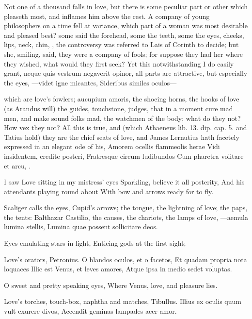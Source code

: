 Not one of a thousand falls in love, but there is some peculiar part or
other which pleaseth most, and inflames him above the rest. A
company of young philosophers on a time fell at variance, which part of
a woman was most desirable and pleased best? some said the forehead,
some the teeth, some the eyes, cheeks, lips, neck, chin, \etc{}, the
controversy was referred to Lais of Corinth to decide; but she,
smiling, said, they were a company of fools; for suppose they had her
where they wished, what would they first seek? Yet this
notwithstanding I do easily grant, neque quis vestrum negaverit opinor,
all parts are attractive, but especially the eyes, 
---videt igne micantes,
Sideribus similes oculos---

which are love's fowlers; aucupium amoris, the shoeing horns, the
hooks of love (as Arandus will) the guides, touchstone, judges, that in
a moment cure mad men, and make sound folks mad, the watchmen of the
body; what do they not? How vex they not? All this is true, and (which
Athaeneus lib. 13. dip. cap. 5. and Tatius hold) they are the chief
seats of love, and James Lernutius hath facetely expressed in an
elegant ode of his,
Amorem ocellis flammeolis herae
Vidi insidentem, credite posteri,
Fratresque circum ludibundos
Cum pharetra volitare et arcu, \etc{}.

I saw Love sitting in my mistress' eyes
Sparkling, believe it all posterity,
And his attendants playing round about
With bow and arrows ready for to fly.

Scaliger calls the eyes, Cupid's arrows; the tongue, the
lightning of love; the paps, the tents: Balthazar Castilio, the
causes, the chariots, the lamps of love,
---aemula lumina stellis,
Lumina quae possent sollicitare deos.

Eyes emulating stars in light,
Enticing gods at the first sight;

Love's orators, Petronius.
O blandos oculos, et o facetos,
Et quadam propria nota loquaces
Illic est Venus, et leves amores,
Atque ipsa in medio sedet voluptas.

O sweet and pretty speaking eyes,
Where Venus, love, and pleasure lies.

Love's torches, touch-box, naphtha and matches, Tibullus.
Illius ex oculis quum vult exurere divos,
Accendit geminas lampades acer amor.

